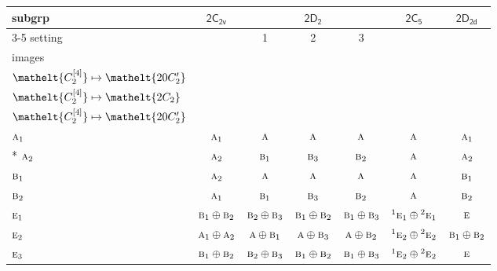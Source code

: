 \documentclass[10pt,a4paper]{article}
\numberwithin{equation}{section}
\newcommand{\eltfont}[1]{{\let\sigma\eltsigma\mathelt{#1}}}
\newcommand{\grp}[1]{\mathsf{#1}}
\newcommand{\irr}[1]{\text{\normalfont\scshape #1}}
\newcommand{\conjpair}[1]{{}^{#1}}
\newcommand{\cls}[1]{\eltfont{#1}}
\newcommand{\genidx}[2]{#1^{[\mathrm{#2}]}}
\begin{document}
{\small\begin{longtable}{@{}lcccccc@{}}\toprule
subgrp & \href{2C2v.pdf}{$\grp{2C_{2v}}$} & \multicolumn{3}{c}{\href{2D2.pdf}{$\grp{2D_{2}}$}} & \href{2C5.pdf}{$\grp{2C_{5}}$} & \href{2D2d.pdf}{$\grp{2D_{2d}}$}\\\cmidrule(lr){3-5}
setting &  & 1 & 2 & 3 &  & \\
images &  & {\scriptsize\begin{tabular}[t]{@{}c@{}}$\cls{\genidx{C_{2}}{2}} \mapsto \cls{2C_{2}}$\\$\cls{\genidx{C_{2}}{4}} \mapsto \cls{20C_{2}'}$\end{tabular}} & {\scriptsize\begin{tabular}[t]{@{}c@{}}$\cls{\genidx{C_{2}}{2}} \mapsto \cls{20C_{2}'}$\\$\cls{\genidx{C_{2}}{4}} \mapsto \cls{2C_{2}}$\end{tabular}} & {\scriptsize\begin{tabular}[t]{@{}c@{}}$\cls{\genidx{C_{2}}{2}} \mapsto \cls{20C_{2}'}$\\$\cls{\genidx{C_{2}}{4}} \mapsto \cls{20C_{2}'}$\end{tabular}} &  & \\\midrule\endhead
\bottomrule\endfoot\endlastfoot
$\irr{a}_{1}$ & $\irr{a}_{1}$ & $\irr{a}$ & $\irr{a}$ & $\irr{a}$ & $\irr{a}$ & $\irr{a}_{1}$\\*
$\irr{a}_{2}$ & $\irr{a}_{2}$ & $\irr{b}_{1}$ & $\irr{b}_{3}$ & $\irr{b}_{2}$ & $\irr{a}$ & $\irr{a}_{2}$\\
$\irr{b}_{1}$ & $\irr{a}_{2}$ & $\irr{a}$ & $\irr{a}$ & $\irr{a}$ & $\irr{a}$ & $\irr{b}_{1}$\\
$\irr{b}_{2}$ & $\irr{a}_{1}$ & $\irr{b}_{1}$ & $\irr{b}_{3}$ & $\irr{b}_{2}$ & $\irr{a}$ & $\irr{b}_{2}$\\
$\irr{e}_{1}$ & $\irr{b}_{1}\oplus \irr{b}_{2}$ & $\irr{b}_{2}\oplus \irr{b}_{3}$ & $\irr{b}_{1}\oplus \irr{b}_{2}$ & $\irr{b}_{1}\oplus \irr{b}_{3}$ & $\conjpair{1}\irr{e}_{1}\oplus \conjpair{2}\irr{e}_{1}$ & $\irr{e}$\\
$\irr{e}_{2}$ & $\irr{a}_{1}\oplus \irr{a}_{2}$ & $\irr{a}\oplus \irr{b}_{1}$ & $\irr{a}\oplus \irr{b}_{3}$ & $\irr{a}\oplus \irr{b}_{2}$ & $\conjpair{1}\irr{e}_{2}\oplus \conjpair{2}\irr{e}_{2}$ & $\irr{b}_{1}\oplus \irr{b}_{2}$\\
$\irr{e}_{3}$ & $\irr{b}_{1}\oplus \irr{b}_{2}$ & $\irr{b}_{2}\oplus \irr{b}_{3}$ & $\irr{b}_{1}\oplus \irr{b}_{2}$ & $\irr{b}_{1}\oplus \irr{b}_{3}$ & $\conjpair{1}\irr{e}_{2}\oplus \conjpair{2}\irr{e}_{2}$ & $\irr{e}$\\

\end{longtable}}
\end{document}
